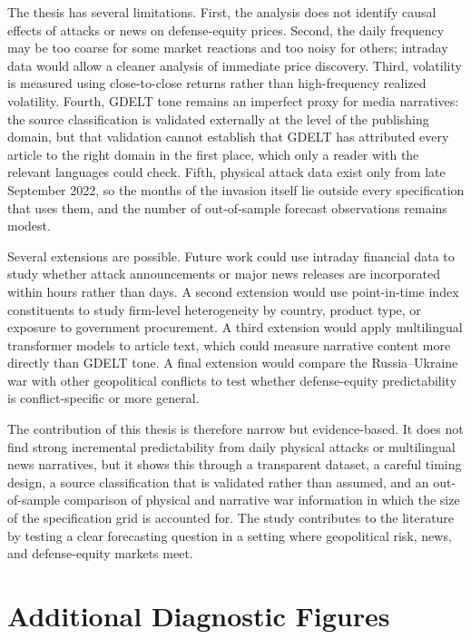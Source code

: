 \documentclass[12pt,a4paper]{article}
\begin{document}
The thesis has several limitations. First, the analysis does not identify causal effects of attacks or news on defense-equity prices. Second, the daily frequency may be too coarse for some market reactions and too noisy for others; intraday data would allow a cleaner analysis of immediate price discovery. Third, volatility is measured using close-to-close returns rather than high-frequency realized volatility. Fourth, GDELT tone remains an imperfect proxy for media narratives: the source classification is validated externally at the level of the publishing domain, but that validation cannot establish that GDELT has attributed every article to the right domain in the first place, which only a reader with the relevant languages could check. Fifth, physical attack data exist only from late September 2022, so the months of the invasion itself lie outside every specification that uses them, and the number of out-of-sample forecast observations remains modest.

Several extensions are possible. Future work could use intraday financial data to study whether attack announcements or major news releases are incorporated within hours rather than days. A second extension would use point-in-time index constituents to study firm-level heterogeneity by country, product type, or exposure to government procurement. A third extension would apply multilingual transformer models to article text, which could measure narrative content more directly than GDELT tone. A final extension would compare the Russia--Ukraine war with other geopolitical conflicts to test whether defense-equity predictability is conflict-specific or more general.

The contribution of this thesis is therefore narrow but evidence-based. It does not find strong incremental predictability from daily physical attacks or multilingual news narratives, but it shows this through a transparent dataset, a careful timing design, a source classification that is validated rather than assumed, and an out-of-sample comparison of physical and narrative war information in which the size of the specification grid is accounted for. The study contributes to the literature by testing a clear forecasting question in a setting where geopolitical risk, news, and defense-equity markets meet.

\newpage
\appendix
\section{Additional Diagnostic Figures}
\end{document}
